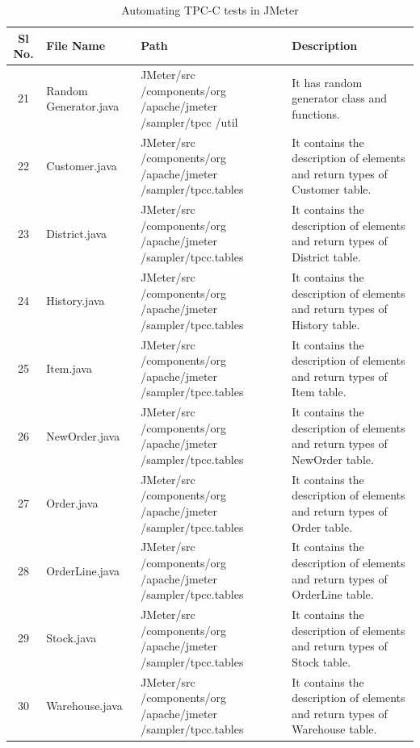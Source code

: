 \documentclass[12pt]{book}
\begin{document}
  \begin{table}[H]
  \begin{center}
   \begin{tabular}{|c|p{3cm}|p{4cm}|p{6cm}|} 
   \hline
   \textbf{Sl No.} & \textbf{File Name} & \textbf{Path} & \textbf{Description}\\
   \hline
   21 & Random Generator.java & JMeter/src /components/org /apache/jmeter /sampler/tpcc /util & It has random generator class  and functions.\\
   \hline
   22 & Customer.java & JMeter/src /components/org /apache/jmeter /sampler/tpcc.tables & It contains the description of elements and return types of Customer table.\\
   \hline
   23 & District.java & JMeter/src /components/org /apache/jmeter /sampler/tpcc.tables & It contains the description of elements and return types of District table.\\
   \hline
   24 & History.java & JMeter/src /components/org /apache/jmeter /sampler/tpcc.tables & It contains the description of elements and return types of History table.\\
   \hline
   25 & Item.java & JMeter/src /components/org /apache/jmeter /sampler/tpcc.tables & It contains the description of elements and return types of Item table.\\
   \hline
   26 & NewOrder.java & JMeter/src /components/org /apache/jmeter /sampler/tpcc.tables & It contains the description of elements and return types of NewOrder table.\\
   \hline
   27 & Order.java & JMeter/src /components/org /apache/jmeter /sampler/tpcc.tables & It contains the description of elements and return types of Order table.\\
   \hline
   28 & OrderLine.java & JMeter/src /components/org /apache/jmeter /sampler/tpcc.tables & It contains the description of elements and return types of OrderLine table.\\
   \hline
   29 & Stock.java & JMeter/src /components/org /apache/jmeter /sampler/tpcc.tables & It contains the description of elements and return types of Stock table.\\
   \hline
   30 & Warehouse.java & JMeter/src /components/org /apache/jmeter /sampler/tpcc.tables & It contains the description of elements and return types of Warehouse table. \\
   \hline
   \end{tabular}
   \caption{Automating TPC-C tests in JMeter}
  \end{center}
 \end{table}
\end{document}
